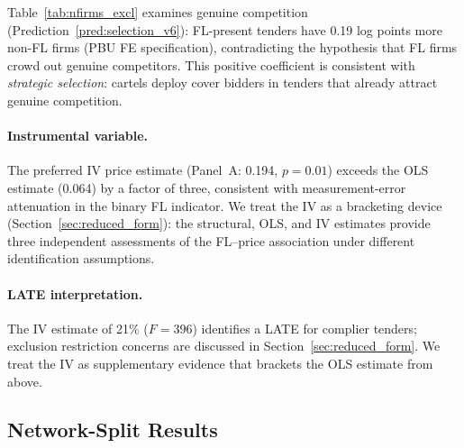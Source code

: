 

Table~\ref{tab:nfirms_excl} examines genuine competition
(Prediction~\ref{pred:selection_v6}): FL-present
tenders have 0.19 log points more non-FL firms (PBU FE specification),
contradicting the hypothesis that FL firms crowd out genuine competitors.
This positive coefficient is consistent with \emph{strategic selection}:
cartels deploy cover bidders in tenders that already attract genuine
competition.



\paragraph{Instrumental variable.}
The preferred IV price estimate (Panel~A: 0.194, $p = 0.01$) exceeds
the OLS estimate (0.064) by a factor of three, consistent with
measurement-error attenuation in the binary FL indicator. We treat the
IV as a bracketing device (Section~\ref{sec:reduced_form}): the
structural, OLS, and IV estimates provide three independent assessments
of the FL--price association under different identification assumptions.



\paragraph{LATE interpretation.}
The IV estimate of 21\% ($F = 396$) identifies a LATE for complier
tenders; exclusion restriction concerns are discussed in
Section~\ref{sec:reduced_form}. We treat the IV as supplementary
evidence that brackets the OLS estimate from above.


\subsection{Network-Split Results}
\label{sec:results_network}

